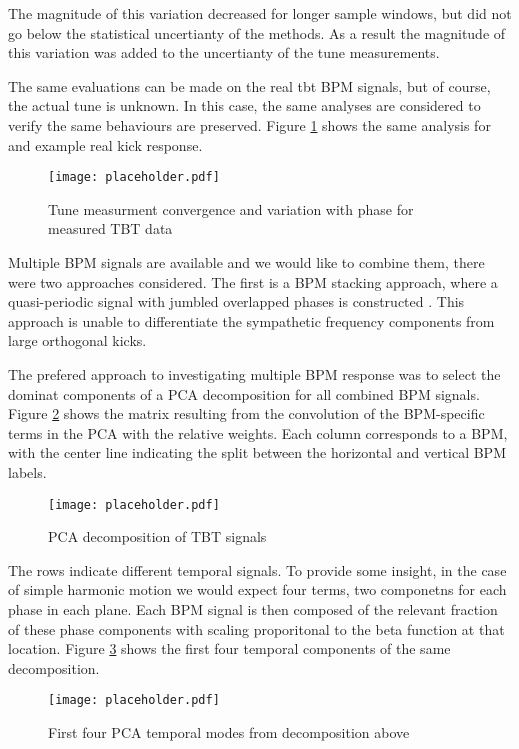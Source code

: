 The magnitude of this variation decreased for longer sample windows, but did not go below the statistical uncertianty of the methods. As a result the magnitude of this variation was added to the uncertianty of the tune measurements.


The same evaluations can be made on the real tbt BPM signals, but of course, the actual tune is unknown. In this case, the same analyses are considered to verify the same behaviours are preserved. Figure \ref{fig:measConvRoll} shows the same analysis for and example real kick response.

\begin{figure}
	\centering \texttt{[image: placeholder.pdf]}
	\caption{Tune measurment convergence and variation with phase for measured TBT data}
	\label{fig:measConvRoll}
\end{figure}


Multiple BPM signals are available and we would like to combine them, there were two approaches considered. The first is a BPM stacking approach, where a quasi-periodic signal with jumbled overlapped phases is constructed \cite{zisopolous}. This approach is unable to differentiate the sympathetic frequency components from large orthogonal kicks. 

The prefered approach to investigating multiple BPM response was to select the dominat components of a PCA decomposition for all combined BPM signals. Figure \ref{fig:pcaComps} shows the matrix resulting from the convolution of the BPM-specific terms in the PCA with the relative weights. Each column corresponds to a BPM, with the center line indicating the split between the horizontal and vertical BPM labels. 

\begin{figure}
	\centering
	\texttt{[image: placeholder.pdf]}
	\caption{PCA decomposition of TBT signals }
	\label{fig:pcaComps}
\end{figure}

The rows indicate different temporal signals. To provide some insight, in the case of simple harmonic motion we would expect four terms, two componetns for each phase in each plane. Each BPM signal is then composed of the relevant fraction of these phase components with scaling proporitonal to the beta function at that location. Figure \ref{fig:pcaTemps} shows the first four temporal components of the same decomposition. 

\begin{figure}
	\centering
	\texttt{[image: placeholder.pdf]}
	\caption{First four PCA temporal modes from decomposition above}
	\label{fig:pcaTemps}
\end{figure}

